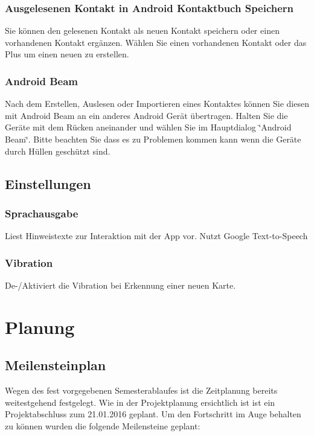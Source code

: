 \documentclass[a4paper,ngerman,12pt]{report}
\begin{document}
\subsection{Ausgelesenen Kontakt in Android Kontaktbuch Speichern}

Sie können den gelesenen Kontakt als neuen Kontakt speichern oder einen vorhandenen Kontakt ergänzen. Wählen Sie einen vorhandenen Kontakt oder das Plus um einen neuen zu erstellen.

\subsection{Android Beam}

Nach dem Erstellen, Auslesen oder Importieren eines Kontaktes können Sie diesen mit Android Beam an ein anderes Android Gerät übertragen. Halten Sie die Geräte mit dem Rücken aneinander und wählen Sie im Hauptdialog \char`\"{}Android Beam\char`\"{}. Bitte beachten Sie dass es zu Problemen kommen kann wenn die Geräte durch Hüllen geschützt sind.

\section{Einstellungen}

\subsection{Sprachausgabe}

Liest Hinweistexte zur Interaktion mit der App vor. Nutzt Google Text-to-Speech 
\subsection{Vibration}

De-/Aktiviert die Vibration bei Erkennung einer neuen Karte. 
 
\chapter{Planung}
\section{Meilensteinplan}

Wegen des fest vorgegebenen Semesterablaufes ist die Zeitplanung bereits weitestgehend festgelegt. Wie in der Projektplanung ersichtlich ist ist ein Projektabschluss zum 21.01.2016 geplant. Um den Fortschritt im Auge behalten zu können wurden die folgende Meilensteine geplant:
\end{document}
